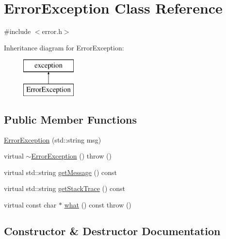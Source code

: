 \hypertarget{classErrorException}{}\section{Error\+Exception Class Reference}
\label{classErrorException}


{\ttfamily \#include $<$error.\+h$>$}

Inheritance diagram for Error\+Exception\+:\begin{figure}[H]
\begin{center}
\leavevmode
\includegraphics[height=2.000000cm]{classErrorException}
\end{center}
\end{figure}
\subsection*{Public Member Functions}
\begin{DoxyCompactItemize}
\item 
\mbox{\hyperlink{classErrorException_a4f422b01fff7cc16eea81e00638f44d2}{Error\+Exception}} (std\+::string msg)
\item 
virtual \mbox{\hyperlink{classErrorException_a8a69609bdba32e156392e54dadadcb18}{$\sim$\+Error\+Exception}} ()  throw ()
\item 
virtual std\+::string \mbox{\hyperlink{classErrorException_a1c1cc72e6e4257dbd29ff04a23973008}{get\+Message}} () const
\item 
virtual std\+::string \mbox{\hyperlink{classErrorException_a79ec2353dbf71c4867c65c6c6df5dfce}{get\+Stack\+Trace}} () const
\item 
virtual const char $\ast$ \mbox{\hyperlink{classErrorException_a8d4b96162e93e11e5816d83702578af8}{what}} () const  throw ()
\end{DoxyCompactItemize}


\subsection{Constructor \& Destructor Documentation}
\mbox{\label{classErrorException_a4f422b01fff7cc16eea81e00638f44d2}} 
